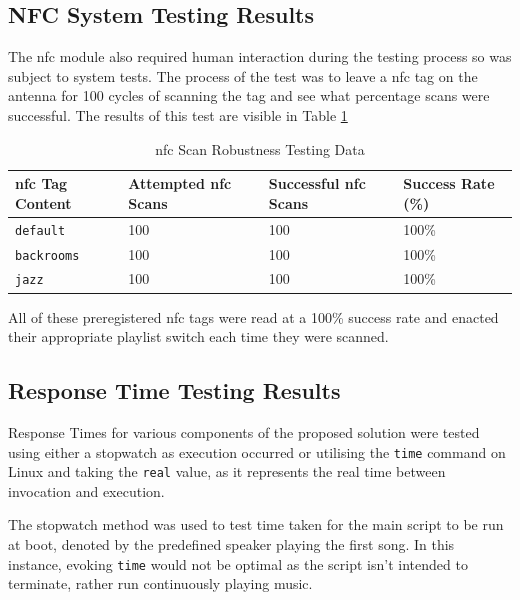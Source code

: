 \subsection{NFC System Testing Results}\label{subsec:NFCResults}
The \gls{nfc} module also required human interaction during the testing process so was subject to system tests. The process of the test was to leave a \gls{nfc} tag on the antenna for 100 cycles of scanning the tag and see what percentage scans were successful. The results of this test are visible in Table \ref{tab:NFCScanResults}
\clearpage
\begin{table}[H]
  \centering
  \caption{\gls{nfc} Scan Robustness Testing Data}
  \label{tab:NFCScanResults}
  \begin{tabular}{llll}
    \toprule
    \gls{nfc} Tag Content & Attempted \gls{nfc} Scans & Successful \gls{nfc} Scans & Success Rate (\%)  \\
    \midrule
    \texttt{default} & 100 & 100 & 100\% \\
    \texttt{backrooms} & 100 & 100 & 100\% \\
    \texttt{jazz} & 100 & 100 & 100\% \\
    \bottomrule
  \end{tabular}
\end{table}

All of these preregistered \gls{nfc} tags were read at a 100\% success rate and enacted their appropriate playlist switch each time they were scanned.

\subsection{Response Time Testing Results}\label{subsec:execTimeResults}
Response Times for various components of the proposed solution were tested using either a stopwatch as execution occurred or utilising the \texttt{time} command on Linux and taking the \texttt{real} value, as it represents the real time between invocation and execution. 

The stopwatch method was used to test time taken for the main script to be run at boot, denoted by the predefined speaker playing the first song. In this instance, evoking \texttt{time} would not be optimal as the script isn't intended to terminate, rather run continuously playing music.

